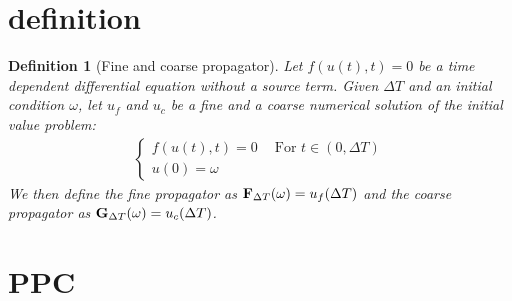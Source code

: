 \documentclass[11pt,a4paper]{article}
\newtheorem{definition}{Definition}
\begin{document}
\section{definition}
\begin{definition}[Fine and coarse propagator]
Let $f(u(t),t)=0$ be a time dependent differential equation without a source term. Given $\Delta T$ and an initial condition $\omega$, let $u_f$ and $u_c$ be a fine and a coarse numerical solution of the initial value problem:
\begin{align}
 \left\{
     \begin{array}{lr}
		f(u(t),t)=0 \ \quad \textrm{For $t \in (0,\Delta T)$} \\
		u(0)=\omega
	\end{array}
	\right.	
\end{align}
We then define the fine propagator as $\bold F_{\Delta T}(\omega) = u_f(\Delta T)$ and the coarse propagator as $\bold G_{\Delta T}(\omega) = u_c(\Delta T)$.
\end{definition}
\section{PPC}
\end{document}
